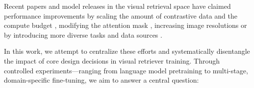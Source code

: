 


Recent papers and model releases in the visual retrieval space have claimed performance improvements by scaling the amount of contrastive data and the compute budget \citep{zhang2025gmeimprovinguniversalmultimodal, xu2025llamanemoretrievercolembedtopperforming}, modifying the attention mask \citep{chen2025mocamodalityawarecontinualpretraining}, increasing image resolutions \citep{cohere_introducing_2024} or by introducing more diverse tasks and data sources \citep{jiang2025vlm2vectrainingvisionlanguagemodels}. %



In this work, we attempt to centralize these efforts and systematically disentangle the impact of core design decisions in visual retriever training. 
Through controlled experiments—ranging from language model pretraining to multi-stage, domain-specific fine-tuning, we aim to answer a central question:

